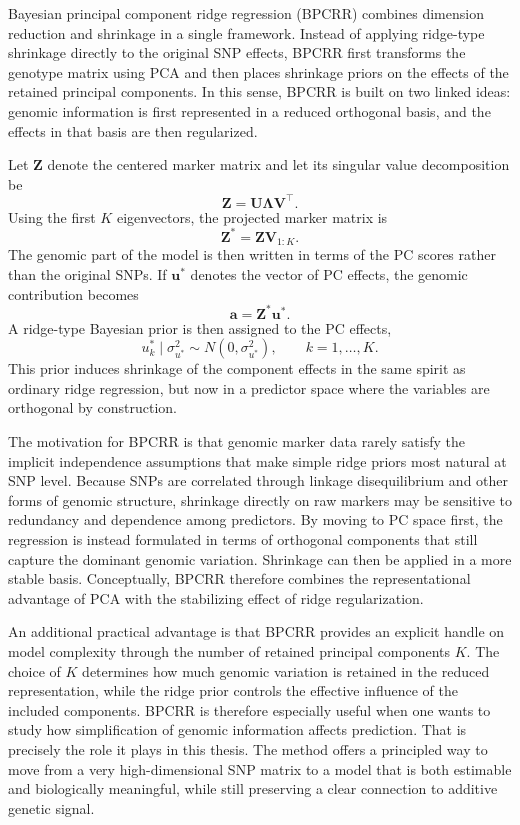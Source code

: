 
Bayesian principal component ridge regression (BPCRR) combines dimension reduction and shrinkage in a single framework. Instead of applying ridge-type shrinkage directly to the original SNP effects, BPCRR first transforms the genotype matrix using PCA and then places shrinkage priors on the effects of the retained principal components. In this sense, BPCRR is built on two linked ideas: genomic information is first represented in a reduced orthogonal basis, and the effects in that basis are then regularized.

Let $\mathbf{Z}$ denote the centered marker matrix and let its singular value decomposition be
\[
\mathbf{Z} = \mathbf{U}\mathbf{\Lambda}\mathbf{V}^{\top}.
\]
Using the first $K$ eigenvectors, the projected marker matrix is
\[
\mathbf{Z}^{*} = \mathbf{Z}\mathbf{V}_{1:K}.
\]
The genomic part of the model is then written in terms of the PC scores rather than the original SNPs. If $\mathbf{u}^{*}$ denotes the vector of PC effects, the genomic contribution becomes
\[
\mathbf{a} = \mathbf{Z}^{*}\mathbf{u}^{*}.
\]
A ridge-type Bayesian prior is then assigned to the PC effects,
\[
u_k^{*} \mid \sigma_{u^{*}}^2 \sim N(0,\sigma_{u^{*}}^2), \qquad k = 1,\dots,K.
\]
This prior induces shrinkage of the component effects in the same spirit as ordinary ridge regression, but now in a predictor space where the variables are orthogonal by construction.

The motivation for BPCRR is that genomic marker data rarely satisfy the implicit independence assumptions that make simple ridge priors most natural at SNP level. Because SNPs are correlated through linkage disequilibrium and other forms of genomic structure, shrinkage directly on raw markers may be sensitive to redundancy and dependence among predictors. By moving to PC space first, the regression is instead formulated in terms of orthogonal components that still capture the dominant genomic variation. Shrinkage can then be applied in a more stable basis. Conceptually, BPCRR therefore combines the representational advantage of PCA with the stabilizing effect of ridge regularization.

An additional practical advantage is that BPCRR provides an explicit handle on model complexity through the number of retained principal components $K$. The choice of $K$ determines how much genomic variation is retained in the reduced representation, while the ridge prior controls the effective influence of the included components. BPCRR is therefore especially useful when one wants to study how simplification of genomic information affects prediction. That is precisely the role it plays in this thesis. The method offers a principled way to move from a very high-dimensional SNP matrix to a model that is both estimable and biologically meaningful, while still preserving a clear connection to additive genetic signal.

